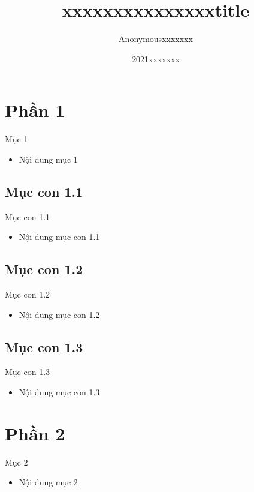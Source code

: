 \documentclass{beamer}
\title{xxxxxxxxxxxxxxxtitle}
\author{Anonymousxxxxxxx}
\institute{Overleafxxxxxxx}
\date{2021xxxxxxx}
\begin{document}


\frame{\titlepage}

\frame{\tableofcontents}




\section{Phần 1}
\begin{frame}{Mục 1}
  \begin{itemize}
    \item Nội dung mục 1
  \end{itemize}
\end{frame}

\subsection{Mục con 1.1}
\begin{frame}{Mục con 1.1}
  \begin{itemize}
    \item Nội dung mục con 1.1
  \end{itemize}
\end{frame}

\subsection{Mục con 1.2}
\begin{frame}{Mục con 1.2}
  \begin{itemize}
    \item Nội dung mục con 1.2
  \end{itemize}
\end{frame}

\subsection{Mục con 1.3}
\begin{frame}{Mục con 1.3}
  \begin{itemize}
    \item Nội dung mục con 1.3
  \end{itemize}
\end{frame}

\section{Phần 2}
\begin{frame}{Mục 2}
  \begin{itemize}
    \item Nội dung mục 2
  \end{itemize}
\end{frame}
\end{document}
